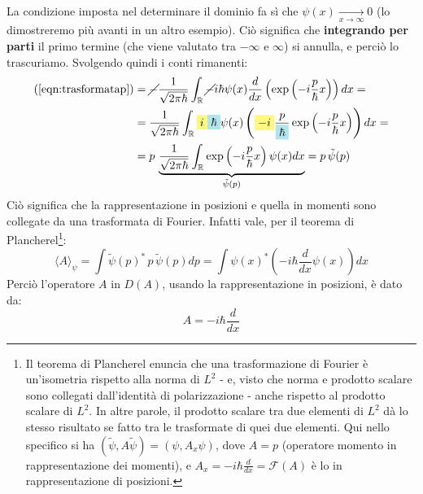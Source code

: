 \documentclass[../../FisicaTeorica.tex]{subfiles}
\begin{document}
La condizione imposta nel determinare il dominio fa sì che $\psi \left(x\right)\xrightarrow[x\to \infty]{} 0$ (lo dimostreremo più avanti in un altro esempio). Ciò significa che \textbf{integrando per parti} il primo termine (che viene valutato tra $-\infty$ e $\infty$) si annulla, e perciò lo trascuriamo. Svolgendo quindi i conti rimanenti:
\begin{align*}
(\ref{eqn:trasformatap}) &= \cancel{-}\frac{1}{\sqrt{2\pi\hbar}}\int_\bb{R} \cancel{-}i\hbar \psi(x) \frac{d}{dx}\left(\exp\left(-i\frac{p}{\hbar}x\right)\right)dx =\\
&= \frac{1}{\sqrt{2\pi\hbar}} \int_\bb{R} \hlc{Yellow}{i} \hlc{SkyBlue}{\hbar} \psi(x) \left(\hlc{Yellow}{-i}\frac{p}{\hlc{SkyBlue}{\hbar}}\exp\left ( -i\frac{p}{\hbar}x\right ) \right )dx=\\
&= p\,\underbrace{\frac{1}{\sqrt{2\pi\hbar}}\int_\bb{R}\exp\left(-i\frac{p}{\hbar}x\right ) \psi(x) dx}_{\tilde{\psi}(p)} = p\,\tilde{\psi}(p)
\end{align*}
Ciò significa che la rappresentazione in posizioni e quella in momenti sono collegate da una trasformata di Fourier. Infatti vale, per il teorema di Plancherel\footnote{Il teorema di Plancherel enuncia che una trasformazione di Fourier è un'isometria rispetto alla norma di $L^2$ - e, visto che norma e prodotto scalare sono collegati dall'identità di polarizzazione - anche rispetto al prodotto scalare di $L^2$. In altre parole, il prodotto scalare tra due elementi di $L^2$ dà lo stesso risultato se fatto tra le trasformate di quei due elementi. Qui nello specifico si ha $(\tilde{\psi},A\tilde{\psi}) = (\psi, A_x \psi)$, dove $A=p$ (operatore momento in rappresentazione dei momenti), e $A_x = -i\hbar \frac{d}{dx} = \mathcal{F}(A)$ è lo  in rappresentazione di posizioni.}:
\[
\langle A \rangle_\psi = \int \tilde{\psi}(p)^*\,p\,\tilde{\psi}(p) dp= \int \psi(x)^* \left ( -i\hbar \frac{d}{dx} \psi(x) \right ) dx
\]
Perciò l'operatore $A$ in $D(A)$, usando la rappresentazione in posizioni, è dato da:
\[
A = -i\hbar \frac{d}{dx}
\]
\end{document}
